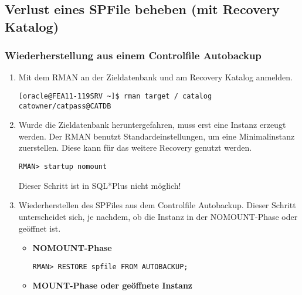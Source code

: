       \subsection{Verlust eines SPFile beheben (mit Recovery Katalog)}
        \subsubsection{Wiederherstellung aus einem Controlfile Autobackup}
          \begin{enumerate}
            \item Mit dem RMAN an der Zieldatenbank und am Recovery Katalog anmelden.
              \begin{lstlisting}[caption={An der Zieldatenbank und am Recovery Katalog anmelden},label=admin1405,language=rman]
[oracle@FEA11-119SRV ~]$ rman target / catalog catowner/catpass@CATDB
              \end{lstlisting}
            \item Wurde die Zieldatenbank heruntergefahren, muss erst eine Instanz erzeugt werden. Der RMAN benutzt Standardeinstellungen, um eine Minimalinstanz zuerstellen. Diese kann f\"ur das weitere Recovery genutzt werden.
              \begin{lstlisting}[caption={Zieldatenbank im RMAN in den NOMOUNT-Status bringen},label=admin1406,language=rman,alsolanguage=sqlplus]
RMAN> startup nomount
              \end{lstlisting}
              \begin{merke}
                Dieser Schritt ist in SQL*Plus nicht m\"oglich!
              \end{merke}
            \item Wiederherstellen des SPFiles aus dem Controlfile Autobackup. Dieser Schritt unterscheidet sich, je nachdem, ob die Instanz in der NOMOUNT-Phase oder ge\"offnet ist.
              \begin{itemize}
                \item \textbf{NOMOUNT-Phase}
                  \begin{lstlisting}[caption={Wiederherstellen des SPFiles aus dem Controlfile Autobackup},label=admin1407,language=rman]
RMAN> RESTORE spfile FROM AUTOBACKUP;
                  \end{lstlisting}
                \item \textbf{MOUNT-Phase oder ge\"offnete Instanz}


\end{itemize}
\end{enumerate}
